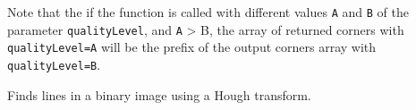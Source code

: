 Note that the if the function is called with different values \texttt{A} and \texttt{B} of the parameter \texttt{qualityLevel}, and \texttt{A} > {B}, the array of returned corners with \texttt{qualityLevel=A} will be the prefix of the output corners array with \texttt{qualityLevel=B}.

Finds lines in a binary image using a Hough transform.


